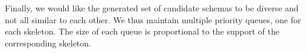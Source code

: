 Finally, we would like the generated set of candidate schemas
to be diverse and not all similar to each other.
We thus maintain multiple priority queues, one for each skeleton.
The size of each queue is proportional to the support of the corresponding
skeleton.

